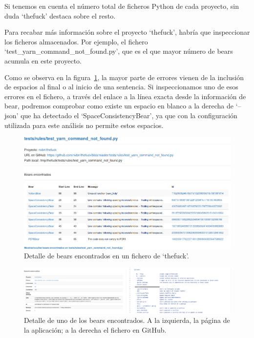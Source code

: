 \documentclass[a4paper, 12pt]{book}
\begin{document}
Si tenemos en cuenta el número total de ficheros Python de cada proyecto, sin duda `thefuck' destaca sobre el resto.

Para recabar más información sobre el proyecto `thefuck', habría que inspeccionar los ficheros almacenados. Por ejemplo, el fichero `test\_yarn\_command\_not\_found.py', que es el que mayor número de bears acumula en este proyecto.

Como se observa en la figura~\ref{fig:ficheroTheFuck}, la mayor parte de errores vienen de la inclusión de espacios al final o al inicio de una sentencia. Si inspeccionamos uno de esos errores en el fichero, a través del enlace a la línea exacta desde la información de bear, podremos comprobar como existe un espacio en blanco a la derecha de `--json' que ha detectado el `SpaceConsistencyBear', ya que con la configuración utilizada para este análisis no permite estos espacios.

\begin{figure}[H]
  \centering
  \includegraphics[width=15cm, keepaspectratio]{img/ficheroTheFuck}
  \caption{Detalle de bears encontrados en un fichero de `thefuck'.}
  \label{fig:ficheroTheFuck}
\end{figure}

\begin{figure}[H]
  \centering
  \includegraphics[width=17cm, keepaspectratio]{img/bearData}
  \caption{Detalle de uno de los bears encontrados. A la izquierda, la página de la aplicación; a la derecha el fichero en GitHub.}
  \label{fig:bearData}
\end{figure}
\end{document}
